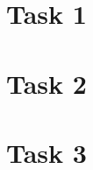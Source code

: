 \documentclass[conference]{IEEEtran}
\begin{document}
\section{Task 1}
\section{Task 2}
\section{Task 3}
%
%



%
%
\end{document}
